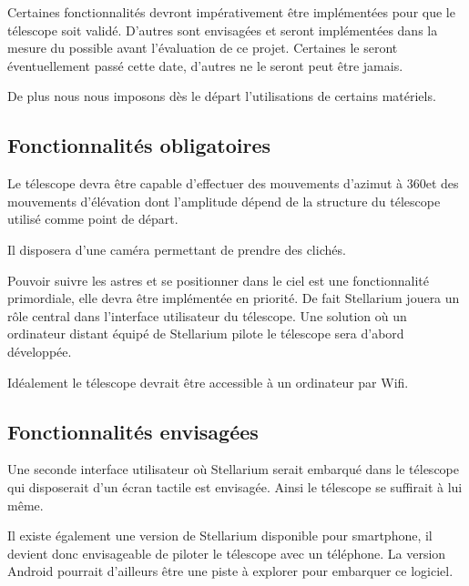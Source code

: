 Certaines fonctionnalités devront impérativement être implémentées pour que le télescope soit validé. D'autres sont envisagées et seront implémentées dans la mesure du possible avant l'évaluation de ce projet. Certaines le seront éventuellement passé cette date, d'autres ne le seront peut être jamais.

De plus nous nous imposons dès le départ l'utilisations de certains matériels.

\subsection{Fonctionnalités obligatoires}

Le télescope devra être capable d'effectuer des mouvements d'azimut à 360\textdegree et des mouvements d'élévation dont l'amplitude dépend de la structure du télescope utilisé comme point de départ.

\vspace{1cm}

Il disposera d'une caméra permettant de prendre des clichés.

\vspace{1cm}

Pouvoir suivre les astres et se positionner dans le ciel est une fonctionnalité primordiale, elle devra être implémentée en priorité. De fait Stellarium jouera un rôle central dans l'interface utilisateur du télescope. Une solution où un ordinateur distant équipé de Stellarium pilote le télescope sera d'abord développée.

\vspace{1cm}

Idéalement le télescope devrait être accessible à un ordinateur par Wifi.


\subsection{Fonctionnalités envisagées}

Une seconde interface utilisateur où Stellarium serait embarqué dans le télescope qui disposerait d'un écran tactile est envisagée. Ainsi le télescope se suffirait à lui même.

Il existe également une version de Stellarium disponible pour smartphone, il devient donc envisageable de piloter le télescope avec un téléphone. La version Android pourrait d'ailleurs être une piste à explorer pour embarquer ce logiciel.
 
